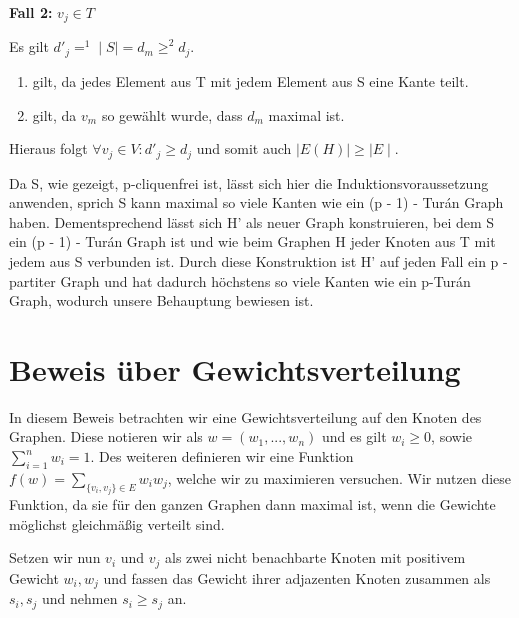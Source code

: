 \documentclass[12pt, a4paper]{article}
\begin{document}
\textbf{Fall 2:} $v_j \in T$

Es gilt $d'_j =^1 \mid S \mid = d_m \ge^2 d_j$.
\begin{enumerate}
\item {}
gilt, da jedes Element aus T mit jedem Element aus S eine Kante teilt.

\item {}
gilt, da $v_m$ so gewählt wurde, dass $d_m$ maximal ist.

\end{enumerate}

Hieraus folgt $\forall v_j \in V: d'_j \ge d_j$ und somit auch $\mid E(H) \mid \ge \mid E \mid$.

Da S, wie gezeigt, p-cliquenfrei ist, lässt sich hier die Induktionsvoraussetzung anwenden, sprich S kann maximal so viele Kanten wie ein (p - 1) - Turán Graph haben. Dementsprechend lässt sich H' als neuer Graph konstruieren, bei dem S ein (p - 1) - Turán Graph ist und wie beim Graphen H jeder Knoten aus T mit jedem aus S verbunden ist. Durch diese Konstruktion ist H' auf jeden Fall ein p - partiter Graph und hat dadurch höchstens so viele Kanten wie ein p-Turán Graph, wodurch unsere Behauptung bewiesen ist.


\section{Beweis über Gewichtsverteilung}
\label{proof/third::doc}\label{proof/third:dritter-beweis-gewichtsverteilung}
In diesem Beweis betrachten wir eine Gewichtsverteilung auf den Knoten des Graphen. Diese notieren wir als $w = (w_1,...,w_n)$ und es gilt $w_i \ge 0$, sowie $\sum^n_{i=1}w_i = 1$. Des weiteren definieren wir eine Funktion $f(w) = \sum_{ \{v_i, v_j\} \in E} w_i w_j$, welche wir zu maximieren versuchen. Wir nutzen diese Funktion, da sie für den ganzen Graphen dann maximal ist, wenn die Gewichte möglichst gleichmäßig verteilt sind.

Setzen wir nun $v_i$ und $v_j$ als zwei nicht benachbarte Knoten mit positivem Gewicht $w_i, w_j$ und fassen das Gewicht ihrer adjazenten Knoten zusammen als $s_i, s_j$ und nehmen $s_i \ge s_j$ an.
\end{document}
